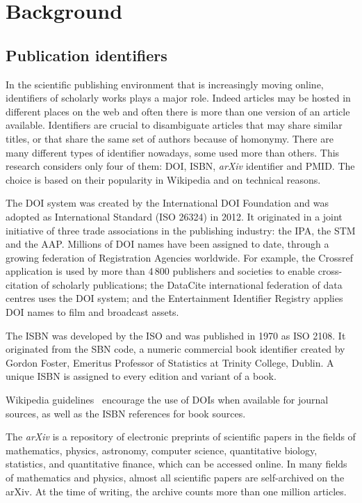 \cleardoublepage{}
\chapter{Background}
\label{cha:background}

\section{Publication identifiers}
\label{sec:Publication identifiers}
In the scientific publishing environment that is increasingly moving online, identifiers of scholarly works plays a major role.
Indeed articles may be hosted in different places on the web and often there is more than one version of an article available.
Identifiers are crucial to disambiguate articles that may share similar titles, or that  share the same set of authors because of homonymy.
There are many different types of identifier nowadays, some used more than others.
This research considers only four of them: \acs{DOI}, \acs{ISBN}, \emph{arXiv} identifier and \acs{PMID}.
The choice is based on their popularity in Wikipedia and on technical reasons.

The \acf{DOI} system was created by the International DOI Foundation and was adopted as International Standard (ISO 26324) in 2012.
It originated in a joint initiative of three trade associations in the publishing industry: the \acf{IPA}, the \acf{STM} and the \acf{AAP}.
Millions of \ac{DOI} names have been assigned to date, through a growing federation of Registration Agencies worldwide.
For example, the Crossref application is used by more than 4\,800 publishers and societies to enable cross-citation of scholarly publications; the DataCite international federation of data centres uses the \ac{DOI} system; and the Entertainment Identifier Registry applies \ac{DOI} names to film and broadcast assets.

The \acf{ISBN} was developed by the \acf{ISO} and was published in 1970 as ISO 2108.
It originated from the \ac{SBN} code, a numeric commercial book identifier created by Gordon Foster, Emeritus Professor of Statistics at Trinity College, Dublin.
A unique \ac{ISBN} is assigned to every edition and variant of a book.

Wikipedia guidelines~\cite{wiki:doi_guideline} encourage the use of \acp{DOI} when available for journal sources, as well as the \ac{ISBN} references for book sources.

The \emph{arXiv} is a repository of electronic preprints of scientific papers in the fields of mathematics, physics, astronomy, computer science, quantitative biology, statistics, and quantitative finance, which can be accessed online.
In many fields of mathematics and physics, almost all scientific papers are self-archived on the arXiv.
At the time of writing, the archive counts more than one million articles.

